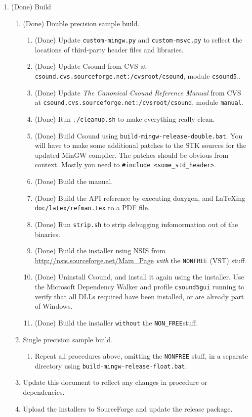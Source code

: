 \documentclass[11pt,letterpaper,onecolumn]{scrartcl}
\begin{document}
\begin{sloppypar}
\begin{enumerate}
\begin{enumerate}
		\end{enumerate}
	\item (Done) Build   
		\begin{enumerate}				
			\item (Done) Double precision sample build.
				\begin{enumerate}
		    	\item (Done) Update \texttt{custom-mingw.py} and \texttt{custom-msvc.py} to reflect the locations of third-party header files and libraries.
					\item (Done) Update Csound from CVS at \verb|csound.cvs.sourceforge.net:/cvsroot/csound|, module \texttt{csound5}..
					\item (Done) Update \emph{The Canonical Csound Reference Manual} from CVS at \verb|csound.cvs.sourceforge.net:/cvsroot/csound|, module \texttt{manual}.
					\item (Done) Run \texttt{./cleanup.sh} to make everything really clean.
			    \item (Done) Build Csound using \texttt{build-mingw-release-double.bat}. You will have to make some additional patches to the STK sources for the updated MinGW compiler. The patches should be obvious from context. Mostly you need to \verb|#include <some_std_header>|.
			    \item (Done) Build the manual.
			    \item (Done) Build the API reference by executing doxygen, and LaTeXing \texttt{doc/latex/refman.tex} to a PDF file.
			    \item (Done) Run \texttt{strip.sh} to strip debugging infomormation out of the binaries.
			    \item (Done) Build the installer using NSIS from \url{http://nsis.sourceforge.net/Main_Page} \emph{with} the \verb|NONFREE| (VST) stuff.  
			    \item (Done) Uninstall Csound, and install it again using the installer. Use the Microsoft Dependency Walker and profile \texttt{csound5gui} running to verify that all DLLs required have been installed, or are already part of Windows.
			    \item (Done) Build the installer \texttt{without} the \verb|NON_FREE|stuff.   
				\end{enumerate}
			\item Single precision sample build.			
				\begin{enumerate}
					\item Repeat all procedures above, omitting the \verb|NONFREE| stuff, in a separate directory using \texttt{build-mingw-release-float.bat}. 
				\end{enumerate}
	    \item Update this document to reflect any changes in procedure or dependencies. 
	    \item Upload the installers to SourceForge and update the release package.
		\end{enumerate}
 \end{enumerate}


\end{sloppypar}
\end{document}

